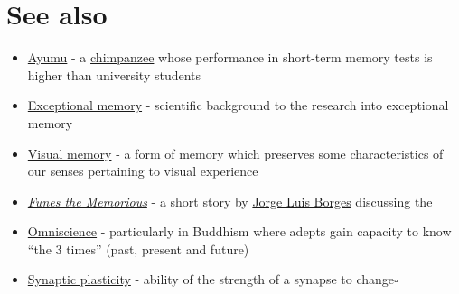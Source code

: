 \documentclass{book}
\numberwithin{equation}{section}
\begin{document}
\section{See also}
\begin{itemize}
    \item \href{https://en.wikipedia.org/wiki/Ayumu_(chimpanzee)}{Ayumu} - a \href{https://en.wikipedia.org/wiki/Common_chimpanzee}{chimpanzee} whose performance in short-term memory tests is higher than university students
    \item \href{https://en.wikipedia.org/wiki/Exceptional_memory}{Exceptional memory} - scientific background to the research into exceptional memory
    \item \href{https://en.wikipedia.org/wiki/Visual_memory}{Visual memory} - a form of memory which preserves some characteristics of our senses pertaining to visual experience
    \item \href{https://en.wikipedia.org/wiki/Funes_the_Memorious}{\textit{Funes the Memorious}} - a short story by \href{https://en.wikipedia.org/wiki/Jorge_Luis_Borges}{Jorge Luis Borges} discussing the 
    \item \href{https://en.wikipedia.org/wiki/Omniscience}{Omniscience} - particularly in Buddhism where adepts gain capacity to know ``the 3 times'' (past, present and future)
    \item \href{https://en.wikipedia.org/wiki/Synaptic_plasticity}{Synaptic plasticity} - ability of the strength of a synapse to change\hfill$\square$
\end{itemize}


\printbibliography[heading=bibintoc]
\end{document}
